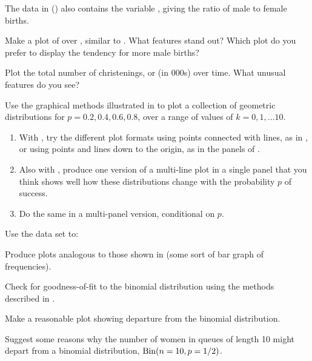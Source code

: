 \documentclass[11pt]{report}\usepackage[]{graphicx}\usepackage[]{color}
\begin{document}
\begin{Exercises}
  \exercise The  data in  () also
   contains the variable
   , giving the ratio of male to female births.
	  \begin{enumerate*}
	    \item Make a plot of  over , similar to .
	    What features stand out?  Which plot do you prefer to display the tendency for
	    more male births?
	    \item Plot the total number of christenings,  or 
	    (in 000s) over time.
	    What unusual features do you see?
	  \end{enumerate*}

  \exercise Use the graphical methods illustrated in 
  to plot a collection of geometric distributions for $p = 0.2, 0.4, 0.6, 0.8$,
  over a range of values of $k = 0, 1, \dots 10$.
  \begin{enumerate}
    \item With , try the different plot formats using points
    connected with lines, as in , or using points
    and lines down to the origin, as in the panels of .
    \item Also with , produce one version of a multi-line plot
    in a single panel that you think shows well how these distributions change
    with the probability $p$ of success.
    \item Do the same in a multi-panel version, conditional on $p$.
  \end{enumerate}

  \exercise Use the data set  to:
  \begin{enumerate*}
    \item Produce plots analogous to those
  shown in  (some sort of bar graph of frequencies).
    \item Check for goodness-of-fit to the binomial distribution using the
     methods described in .
    \item Make a reasonable plot showing departure from the binomial distribution.
    \item Suggest some reasons why the number of women in queues of length 10
    might depart from a binomial distribution, $\Bin(n=10, p=1/2)$.
  \end{enumerate*}


\end{Exercises}
\end{document}
